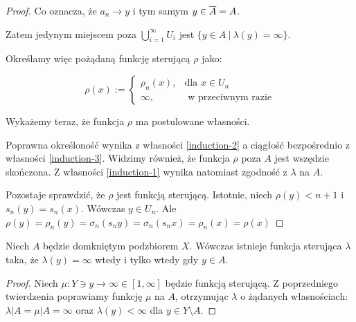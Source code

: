 \begin{thm}
\begin{proof}
  Co oznacza, że $a_n \rightarrow y$ i tym samym $y \in \overline{A} = A$.
  
  Zatem jedynym miejscem poza $\bigcup_{i=1}^\infty U_i$ jest $\{y \in A\ |\ \lambda(y) = \infty\}$.
  
  Określamy więc pożądaną funkcję sterującą $\rho$ jako:
  
  $$\rho(x) := 
    \begin{cases}
      \rho_n(x),&\mbox{dla } x \in U_n \\
      \infty,&\mbox{ w przeciwnym razie}
    \end{cases}
  $$
  
  Wykażemy teraz, że funkcja $\rho$ ma postulowane własności.
  
  Poprawna określoność wynika z własności \ref{induction-2} a ciągłość bezpośrednio z własności \ref{induction-3}. Widzimy również, że funkcja $\rho$ poza $A$ jest wszędzie skończona. Z własności \ref{induction-1} wynika natomiast zgodność z $\lambda$ na $A$.
  
  Pozostaje sprawdzić, że $\rho$ jest funkcją sterującą. Istotnie, niech $\rho(y) < n+1$ i $s_n(y) = s_n(x)$. Wówczas $y \in U_n$. Ale $\rho(y) = \rho_n(y) = \sigma_n(s_n y) = \sigma_n(s_n x) = \rho_n(x) = \rho(x)$
\end{proof}
\end{thm}


\begin{cor}
  Niech $A$ będzie domkniętym podzbiorem $X$. Wówczas istnieje funkcja sterująca $\lambda$ taka, że $\lambda(y) = \infty$ wtedy i tylko wtedy gdy $y \in A$.
  
  \begin{proof}
    Niech $\mu: Y \ni y \rightarrow \infty \in [1, \infty]$ będzie funkcją sterującą. Z poprzedniego twierdzenia poprawiamy funkcję $\mu$ na $A$, otrzymując $\lambda$ o żądanych własnościach: $\lambda|A = \mu|A = \infty$ oraz $\lambda(y) < \infty$ dla $y \in Y \setminus A$.
  \end{proof}
\end{cor}



